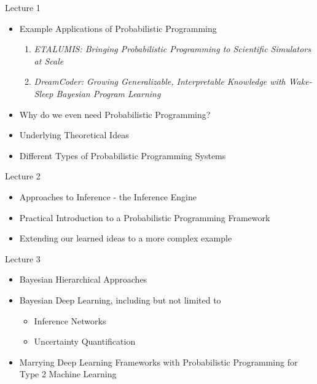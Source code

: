 \documentclass[AERbeamer%
              ,optEnglish%
              ,optBiber%
              ,optBibstyleAlphabetic%
              ,optBeamerClassicFormat%
              ]{AERlatex}%
\begin{document}
\begin{frame}[c]{Lecture 1}
    \centering
    \begin{itemize}
        \item Example Applications of Probabilistic Programming
        \begin{enumerate}
            \item \textit{ETALUMIS: Bringing Probabilistic Programming to Scientific Simulators at Scale}
            \item \textit{DreamCoder: Growing Generalizable, Interpretable Knowledge with Wake-Sleep Bayesian Program Learning}
        \end{enumerate}
        \item Why do we even need Probabilistic Programming?
        \item Underlying Theoretical Ideas
        \item Different Types of Probabilistic Programming Systems
    \end{itemize}
\end{frame}


\begin{frame}[c]{Lecture 2}
    \centering
    \begin{itemize}
        \item Approaches to Inference - the Inference Engine
        \item Practical Introduction to a Probabilistic Programming Framework
        \item Extending our learned ideas to a more complex example
    \end{itemize}
\end{frame}


\begin{frame}[c]{Lecture 3}
    \centering
    \begin{itemize}
        \item Bayesian Hierarchical Approaches
        \item Bayesian Deep Learning, including but not limited to
        \begin{itemize}
            \item Inference Networks
            \item Uncertainty Quantification
        \end{itemize}
        \item Marrying Deep Learning Frameworks with Probabilistic Programming for Type 2 Machine Learning
    \end{itemize}
\end{frame}
\end{document}
